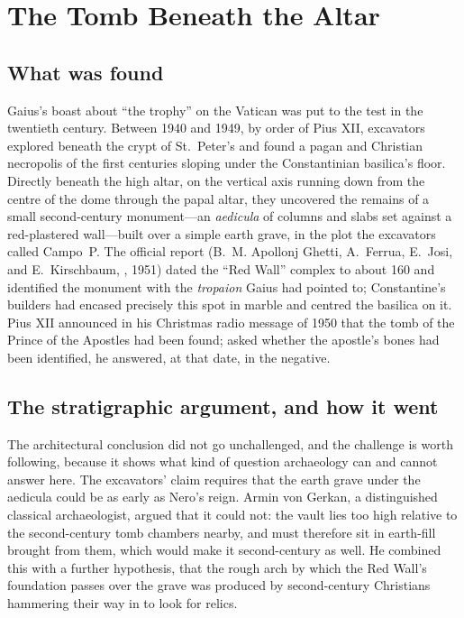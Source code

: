\section{The Tomb Beneath the Altar}

\subsection{What was found}

Gaius's boast about ``the trophy'' on the Vatican was put to the test in the
twentieth century. Between 1940 and 1949, by order of Pius XII, excavators
explored beneath the crypt of St.~Peter's and found a pagan and Christian
necropolis of the first centuries sloping under the Constantinian basilica's
floor. Directly beneath the high altar, on the vertical axis running down
from the centre of the dome through the papal altar, they uncovered the
remains of a small second-century monument---an \textit{aedicula} of columns
and slabs set against a red-plastered wall---built over a simple earth grave,
in the plot the excavators called Campo~P. The official report
(B.~M. Apollonj Ghetti, A.~Ferrua, E.~Josi, and E.~Kirschbaum,
, 1951) dated the ``Red
Wall'' complex to about 160 and identified the monument with the
\textit{tropaion} Gaius had pointed to; Constantine's builders had encased
precisely this spot in marble and centred the basilica on it. Pius XII
announced in his Christmas radio message of 1950 that the tomb of the Prince
of the Apostles had been found; asked whether the apostle's bones had been
identified, he answered, at that date, in the negative.

\subsection{The stratigraphic argument, and how it went}

The architectural conclusion did not go unchallenged, and the challenge is
worth following, because it shows what kind of question archaeology can and
cannot answer here. The excavators' claim requires that the earth grave under
the aedicula could be as early as Nero's reign. Armin von Gerkan, a
distinguished classical archaeologist, argued that it could not: the vault
lies too high relative to the second-century tomb chambers nearby, and must
therefore sit in earth-fill brought from them, which would make it
second-century as well. He combined this with a further hypothesis, that the
rough arch by which the Red Wall's foundation passes over the grave was
produced by second-century Christians hammering their way in to look for
relics.

